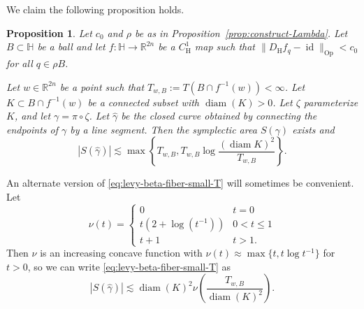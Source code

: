 \documentclass[12pt,reqno]{amsart}
\newcommand{\DfH}{D_\mathrm{H}f}
\newcommand{\HH}{\mathbb{H}}
\newcommand{\R}{\mathbb{R}}
\newcommand{\from}{\colon}
\newtheorem{prop}[thm]{Proposition}
\theoremstyle{remark}
\newcommand{\0}{\mathbf{0}}
\renewcommand{\1}{\mathbf 1}
\DeclareMathOperator{\diam}{diam}
\DeclareMathOperator{\id}{id}
\begin{document}
We claim the following proposition holds. 
\begin{prop}\label{prop:levy-beta-fiber}
  Let $c_0$ and $\rho$ be as in Proposition~\ref{prop:construct-Lambda}. Let $B\subset \HH$ be a ball and let $f\from \HH\to \R^{2n}$ be a $C^1_{\mathrm{H}}$ map such that $\|\DfH_q - \id\|_{\mathrm{Op}} < c_0$ for all $q\in \rho B$.

  Let $w\in \R^{2n}$ be a point such that $T_{w,B} := T(B\cap f^{-1}(w)) < \infty$. Let $K\subset B\cap f^{-1}(w)$ be a connected subset with $\diam(K)>0$. Let $\zeta$ parameterize $K$, and let $\gamma= \pi\circ \zeta$. 
  Let $\hat\gamma$ be the closed curve obtained by connecting the endpoints of $\gamma$ by a line segment. Then the symplectic area $S(\gamma)$ exists and
  \begin{equation}\label{eq:levy-beta-fiber-small-T}
    |S(\hat{\gamma})| \lesssim \max\left\{T_{w,B}, T_{w,B} \log \frac{(\diam K)^2}{T_{w,B}}\right\}.
  \end{equation}
\end{prop}
An alternate version of \eqref{eq:levy-beta-fiber-small-T} will sometimes be convenient. Let 
$$\nu(t) = \begin{cases}
  0 & t = 0\\
  t (2 + \log(t^{-1})) & 0 < t \le 1\\
  t + 1 & t > 1.
\end{cases}$$
Then $\nu$ is an increasing concave function with $\nu(t) \approx \max\{t, t \log t^{-1}\}$ for $t>0$, so we can write \eqref{eq:levy-beta-fiber-small-T} as
\begin{equation}\label{eq:alt-levy-beta}
  |S(\hat{\gamma})| \lesssim \diam(K)^2 \nu\left(\frac{T_{w,B}}{\diam(K)^2}\right).
\end{equation}
\end{document}
